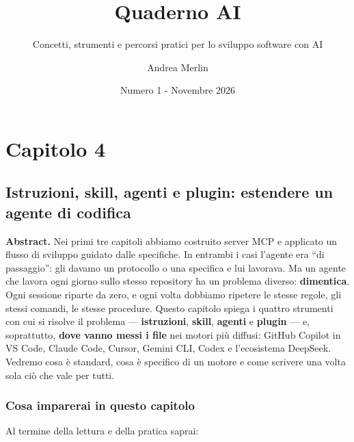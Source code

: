 \documentclass[
  italian,
  10pt,
]{book}
\title{Quaderno AI}
\subtitle{Concetti, strumenti e percorsi pratici per lo sviluppo
software con AI}
\author{Andrea Merlin}
\date{Numero 1 - Novembre 2026}
\begin{document}
\frontmatter
\maketitle

{
\setcounter{tocdepth}{1}
\tableofcontents
}
\mainmatter
\chapter{Capitolo 4}\label{capitolo-4}

\section{Istruzioni, skill, agenti e plugin: estendere un agente di
codifica}\label{istruzioni-skill-agenti-e-plugin-estendere-un-agente-di-codifica}

\textbf{Abstract.} Nei primi tre capitoli abbiamo costruito server MCP e
applicato un flusso di sviluppo guidato dalle specifiche. In entrambi i
casi l'agente era ``di passaggio'': gli davamo un protocollo o una
specifica e lui lavorava. Ma un agente che lavora ogni giorno sullo
stesso repository ha un problema diverso: \textbf{dimentica}. Ogni
sessione riparte da zero, e ogni volta dobbiamo ripetere le stesse
regole, gli stessi comandi, le stesse procedure. Questo capitolo spiega
i quattro strumenti con cui si risolve il problema ---
\textbf{istruzioni}, \textbf{skill}, \textbf{agenti} e \textbf{plugin}
--- e, soprattutto, \textbf{dove vanno messi i file} nei motori più
diffusi: GitHub Copilot in VS Code, Claude Code, Cursor, Gemini CLI,
Codex e l'ecosistema DeepSeek. Vedremo cosa è standard, cosa è specifico
di un motore e come scrivere una volta sola ciò che vale per tutti.

\subsection{Cosa imparerai in questo
capitolo}\label{cosa-imparerai-in-questo-capitolo}

Al termine della lettura e della pratica saprai:
\end{document}
